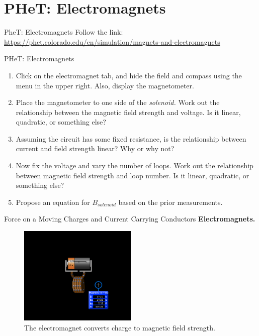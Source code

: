 \documentclass{beamer}
\begin{document}
\section{PHeT: Electromagnets}

\begin{frame}{PheT: Electromagnets}
Follow the link: \\ \vspace{0.5cm}
\url{https://phet.colorado.edu/en/simulation/magnets-and-electromagnets}
\end{frame}

\begin{frame}{PHeT: Electromagnets}
\small
\begin{enumerate}
\item Click on the electromagnet tab, and hide the field and compass using the menu in the upper right.  Also, display the magnetometer.
\item Place the magnetometer to one side of the \textit{solenoid.}  Work out the relationship between the magnetic field strength and voltage.  Is it linear, quadratic, or something else?
\item Assuming the circuit has some fixed resistance, is the relationship between current and field strength linear?  Why or why not?
\item Now fix the voltage and vary the number of loops.  Work out the relationship between magnetic field strength and loop number.  Is it linear, quadratic, or something else?
\item Propose an equation for $B_{solenoid}$ based on the prior measurements.
\end{enumerate}
\end{frame}

\begin{frame}{Force on a Moving Charges and Current Carrying Conductors}
\textbf{Electromagnets.}
\begin{figure}
\centering
\includegraphics[width=0.5\textwidth]{figures/phetemmag.png}
\caption{\label{fig:phetemmag} The electromagnet converts charge to magnetic field strength.}
\end{figure}
\end{frame}
\end{document}
